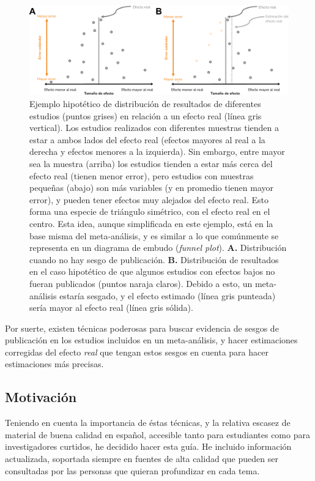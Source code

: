 \documentclass[
  bookmarksnumbered]{article}
\begin{document}
\begin{figure}
\centering
\includegraphics{images/Teoria-meta_FIN.pdf}
\caption{\label{fig:teoria-meta}Ejemplo hipotético de distribución de resultados de diferentes estudios (puntos grises) en relación a un efecto real (línea gris vertical). Los estudios realizados con diferentes muestras tienden a estar a ambos lados del efecto real (efectos mayores al real a la derecha y efectos menores a la izquierda). Sin embargo, entre mayor sea la muestra (arriba) los estudios tienden a estar más cerca del efecto real (tienen menor error), pero estudios con muestras pequeñas (abajo) son más variables (y en promedio tienen mayor error), y pueden tener efectos muy alejados del efecto real. Esto forma una especie de triángulo simétrico, con el efecto real en el centro. Esta idea, aunque simplificada en este ejemplo, está en la base misma del meta-análisis, y es similar a lo que comúnmente se representa en un diagrama de embudo (\textit{funnel plot}). \textbf{A.} Distribución cuando no hay sesgo de publicación. \textbf{B.} Distribución de resultados en el caso hipotético de que algunos estudios con efectos bajos no fueran publicados (puntos naraja claros). Debido a esto, un meta-análisis estaría sesgado, y el efecto estimado (línea gris punteada) sería mayor al efecto real (línea gris sólida).}
\end{figure}

Por suerte, existen técnicas poderosas para buscar evidencia de sesgos de publicación en los estudios incluidos en un meta-análisis, y hacer estimaciones corregidas del efecto \emph{real} que tengan estos sesgos en cuenta para hacer estimaciones más precisas.

\hypertarget{motivaciuxf3n}{%
\subsection{Motivación}\label{motivaciuxf3n}}

Teniendo en cuenta la importancia de éstas técnicas, y la relativa escasez de material de buena calidad en español, accesible tanto para estudiantes como para investigadores curtidos, he decidido hacer esta guía. He incluido información actualizada, soportada siempre en fuentes de alta calidad que pueden ser consultadas por las personas que quieran profundizar en cada tema.
\end{document}
